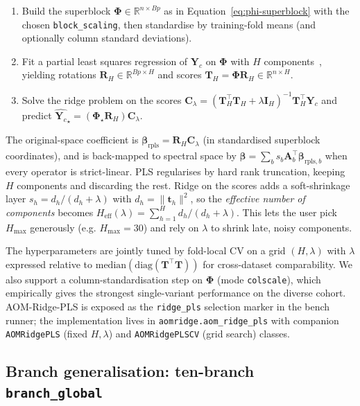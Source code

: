 \documentclass[11pt,a4paper]{article}
\newcommand{\R}{\mathbb{R}}
\newcommand{\Yc}{\mathbf{Y}_{\!c}}
\newcommand{\Amat}{\mathbf{A}}
\newcommand{\Cmat}{\mathbf{C}}
\newcommand{\Rmat}{\mathbf{R}}
\newcommand{\Tmat}{\mathbf{T}}
\newcommand{\Imat}{\mathbf{I}}
\newcommand{\tvec}{\mathbf{t}}
\newcommand{\Phimat}{\mathbf{\Phi}}
\begin{document}
\begin{enumerate}[leftmargin=2em,itemsep=0pt]
  \item Build the superblock $\Phimat\in\R^{n\times Bp}$ as in
        Equation~\eqref{eq:phi-superblock} with the chosen
        \texttt{block\_scaling}, then standardise by training-fold
        means (and optionally column standard deviations).
  \item Fit a partial least squares regression of $\Yc$ on $\Phimat$
        with $H$ components~\citep{wold2001pls}, yielding rotations
        $\Rmat_H\in\R^{Bp\times H}$ and scores
        $\Tmat_H=\Phimat\Rmat_H\in\R^{n\times H}$.
  \item Solve the ridge problem on the scores
        $\Cmat_\lambda=(\Tmat_H^\top\Tmat_H+\lambda\Imat_H)^{-1}\Tmat_H^\top\Yc$
        and predict
        $\hat{\Yc}_\star=(\Phimat_\star\Rmat_H)\Cmat_\lambda$.
\end{enumerate}

The original-space coefficient is
$\bm\beta_{\mathrm{rpls}}=\Rmat_H\Cmat_\lambda$ (in standardised
superblock coordinates), and is back-mapped to spectral space by
$\bm\beta=\sum_b s_b\Amat_b^\top\bm\beta_{\mathrm{rpls},b}$ when every
operator is strict-linear. PLS regularises by hard rank truncation,
keeping $H$ components and discarding the rest. Ridge on the scores
adds a soft-shrinkage layer
$s_h=d_h/(d_h+\lambda)$ with $d_h=\|\tvec_h\|^2$, so the
\emph{effective number of components} becomes
$H_{\mathrm{eff}}(\lambda)=\sum_{h=1}^{H}d_h/(d_h+\lambda)$. This
lets the user pick $H_{\max}$ generously (e.g. $H_{\max}=30$) and rely
on $\lambda$ to shrink late, noisy components.

The hyperparameters are jointly tuned by fold-local CV on a grid
$(H,\lambda)$ with $\lambda$ expressed relative to
$\mathrm{median}(\mathrm{diag}(\Tmat^\top\Tmat))$ for cross-dataset
comparability. We also support a column-standardisation step on
$\Phimat$ (mode \texttt{colscale}), which empirically gives the
strongest single-variant performance on the diverse cohort. AOM-Ridge-PLS
is exposed as the \texttt{ridge\_pls} selection marker in the bench
runner; the implementation lives in \texttt{aomridge.aom\_ridge\_pls}
with companion \texttt{AOMRidgePLS} (fixed $H,\lambda$) and
\texttt{AOMRidgePLSCV} (grid search) classes.

\subsection{Branch generalisation: ten-branch \texttt{branch\_global}}\label{sec:method-branch10}
\end{document}
